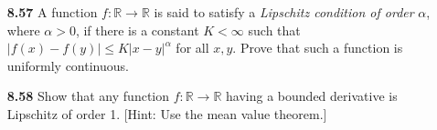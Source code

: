 \documentclass[12pt]{amsart}
\def\RR{{\mathbb R}}
\begin{document}
\begin{enumerate}
\bigskip

\item[\bf 8.57] A function $f:\RR\to\RR$ is said to satisfy a \textit{Lipschitz condition of order} $\alpha$, where $\alpha>0$, if there is a constant $K<\infty$ such that $|f(x)-f(y)|\leq K|x-y|^\alpha$ for all $x,y$. Prove that such a function is uniformly continuous. 

\bigskip

\item[\bf 8.58] Show that any function $f:\RR\to\RR$ having a bounded derivative is Lipschitz of order 1. [Hint: Use the mean value theorem.]

\bigskip

\end{enumerate}
\end{document}
